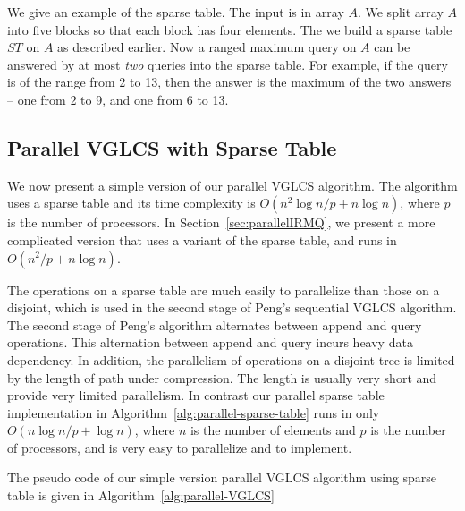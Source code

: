 We give an example of the sparse table.  The input is in array $A$. We
split array $A$ into five blocks so that each block has four elements.
The we build a sparse table $ST$ on $A$ as described earlier.  Now a
ranged maximum query on $A$ can be answered by at most {\em two}
queries into the sparse table.  For example, if the query is of the
range from 2 to 13, then the answer is the maximum of the two answers
-- one from 2 to 9, and one from 6 to 13.

\subsection{Parallel VGLCS with Sparse Table}

We now present a simple version of our parallel VGLCS algorithm.  The
algorithm uses a sparse table and its time complexity is $O(n^2 \log n
/ p + n \log n)$, where $p$ is the number of processors.  In
Section~\ref{sec:parallelIRMQ}, we present a more complicated version
that uses a variant of the sparse table, and runs in $O(n^2 / p + n
\log n)$.

The operations on a sparse table are much easily to parallelize than
those on a disjoint, which is used in the second stage of Peng's
sequential VGLCS algorithm.  The second stage of Peng's algorithm
alternates between append and query operations.  This alternation
between append and query incurs heavy data dependency.  In addition,
the parallelism of operations on a disjoint tree is limited by the
length of path under compression.  The length is usually very short
and provide very limited parallelism.  In contrast our parallel sparse
table implementation in Algorithm~\ref{alg:parallel-sparse-table} runs
in only $O(n \log n / p + \log n)$, where $n$ is the number of
elements and $p$ is the number of processors, and is very easy to
parallelize and to implement.



The pseudo code of our simple version parallel VGLCS algorithm using
sparse table is given in Algorithm~\ref{alg:parallel-VGLCS}


